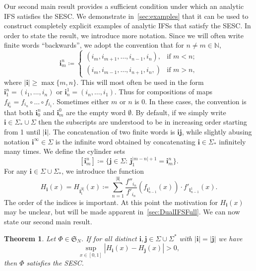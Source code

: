 \documentclass[12pt,]{article}
\def\cref#1{\ref{#1}}%
\newtheorem{theorem}{Theorem}[section]
\theoremstyle{definition}
\theoremstyle{remark}
\newcommand{\0}{\mathbf{0}}
\newcommand{\bi}{\mathbf{i}}
\newcommand{\bj}{\mathbf{j}}
\begin{document}
{Our second main result provides a sufficient condition under which an analytic IFS satisfies the
SESC. We demonstrate in~\cref{sec:examples} that it can be used to construct completely explicit
examples of analytic IFSs that satisfy the SESC. In order to state the result, we introduce more
notation. Since we will often write finite words ``backwards'', we adopt the convention that for
$n\neq m\in\mathbb{N}$,
\begin{equation*}
	\bi_m^n\coloneqq
	\begin{cases}
		(i_m,i_{m+1},\ldots,i_{n-1},i_n), &\text{if } m<n; \\
		(i_m,i_{m-1},\ldots,i_{n+1},i_n,) &\text{if } m>n,
	\end{cases}
\end{equation*}
where $|\bi|\geq\max\{m,n\}$. This will most often be used in the form $\bi_1^n=(i_1,\ldots,i_n)$ or
$\bi_n^1=(i_n,\ldots,i_1)$. Thus for compositions of maps $f_{\bi_n^1}=f_{i_n}\circ \dots \circ
f_{i_1}$. Sometimes either $m$ or $n$ is $0$. In these cases, the convention is that both $\bi_0^n$
and $\bi_m^0$ are the empty word $\emptyset$. By default, if we simply write
$\bi\in\Sigma_*\cup\Sigma$ then the subscripts are understood to be in increasing order starting
from 1 until $|\bi|$. The concatenation of two finite words is $\bi\bj$, while slightly abusing
notation $\bi^{\infty}\in \Sigma$ is the infinite word obtained by concatenating $\bi\in\Sigma_*$
infinitely many times. We define the cylinder sets
$$[\bi_m^n] \coloneqq \big\{\bj\in\Sigma :\, \bj_1^{|m-n|+1} = \bi_m^n\big\}.$$  
For any $\bi\in \Sigma\cup\Sigma_*$, we introduce the function 
\begin{equation}\label{eq:H_i(x)}
H_{\bi}(x)=H_{\bi_{1}^{|\bi|}}(x) \coloneqq \sum_{n=1}^{|\bi|}
\frac{f''_{i_n}}{f'_{i_n}}(f_{\bi_{n-1}^1}(x))\cdot f'_{\bi_{n-1}^1}(x).
\end{equation}
The order of the indices is important. At this point the motivation for $H_{\bi}(x)$ may be unclear,
but will be made apparent in~\cref{sec:DualIFSFull}. 
We can now state our second main result.
\begin{theorem}
  \label{thm:main}
  Let $\Phi\in\mathfrak{S}_N$. If for all distinct $\bi,\bj \in\Sigma\cup\Sigma^*$ with $|\bi|=|\bj|$ we have
\begin{equation}\label{eq:H_iSSC}
    \sup_{x\in[0,1]} |H_{\bi}(x) - H_{\bj}(x)| > 0,
\end{equation}
then $\Phi$ satisfies the SESC.
\end{theorem}

}
\end{document}
